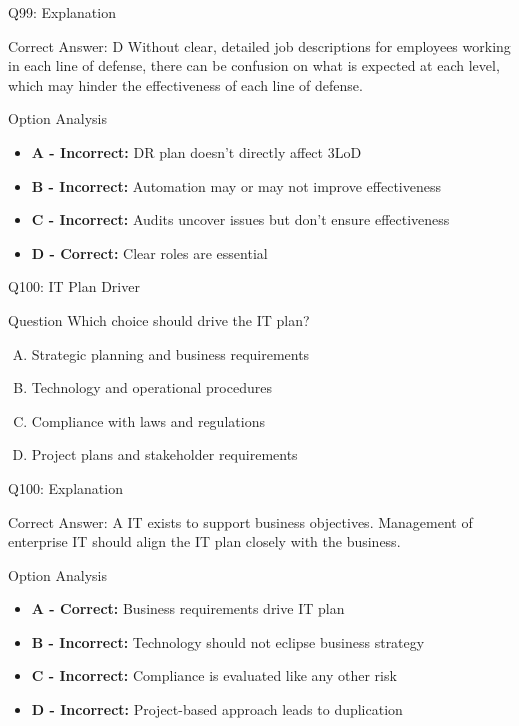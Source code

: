 \documentclass{beamer}
\begin{document}
	\begin{frame}{Q99: Explanation}
		\begin{block}{Correct Answer: D}
			Without clear, detailed job descriptions for employees working in each line of defense, there can be confusion on what is expected at each level, which may hinder the effectiveness of each line of defense.
		\end{block}
		\begin{block}{Option Analysis}
			\begin{itemize}
				\item \textbf{A - Incorrect:} DR plan doesn't directly affect 3LoD
				\item \textbf{B - Incorrect:} Automation may or may not improve effectiveness
				\item \textbf{C - Incorrect:} Audits uncover issues but don't ensure effectiveness
				\item \textbf{D - Correct:} Clear roles are essential
			\end{itemize}
		\end{block}
	\end{frame}
	
	\begin{frame}{Q100: IT Plan Driver}
		\begin{block}{Question}
			Which choice should drive the IT plan?
		\end{block}
		\begin{enumerate}[(A)]
			\item Strategic planning and business requirements
			\item Technology and operational procedures
			\item Compliance with laws and regulations
			\item Project plans and stakeholder requirements
		\end{enumerate}
	\end{frame}
	
	\begin{frame}{Q100: Explanation}
		\begin{block}{Correct Answer: A}
			IT exists to support business objectives. Management of enterprise IT should align the IT plan closely with the business.
		\end{block}
		\begin{block}{Option Analysis}
			\begin{itemize}
				\item \textbf{A - Correct:} Business requirements drive IT plan
				\item \textbf{B - Incorrect:} Technology should not eclipse business strategy
				\item \textbf{C - Incorrect:} Compliance is evaluated like any other risk
				\item \textbf{D - Incorrect:} Project-based approach leads to duplication
			\end{itemize}
		\end{block}
	\end{frame}
	
\end{document}
